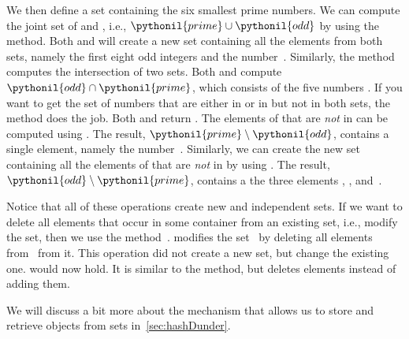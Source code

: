 \begin{sloppypar}%
We then define a set  containing the six smallest prime numbers.
We can compute the joint set of  and , i.e., $\pythonil{prime}\cup\pythonil{odd}$ by using the  method.
Both  and  will create a new set containing all the elements from both sets, namely the first eight odd integers and the number~.
Similarly, the  method computes the intersection of two sets.
Both  and  compute $\pythonil{odd}\cap\pythonil{prime}$, which consists of the five numbers .
If you want to get the set of numbers that are either in  or in  but not in both sets, the method  does the job.
Both  and  return .
The elements of  that are \emph{not} in  can be computed using .
The result, $\pythonil{prime}\setminus\pythonil{odd}$, contains a single element, namely the number~.
Similarly, we can create the new set  containing all the elements of  that are \emph{not} in  by using .
The result, $\pythonil{odd}\setminus\pythonil{prime}$, contains a the three elements , , and~.%
\end{sloppypar}%
%
Notice that all of these operations create new and independent sets.
If we want to delete all elements that occur in some container from an existing set, i.e., modify the set, then we use the method~.
 modifies the set~ by deleting all elements from~ from it.
This operation did not create a new set, but change the existing one.
 would now hold.
It is similar to the  method, but deletes elements instead of adding them.

We will discuss a bit more about the mechanism that allows us to store and retrieve objects from sets in~\cref{sec:hashDunder}.%
%
\FloatBarrier%
\endhsection%
%
